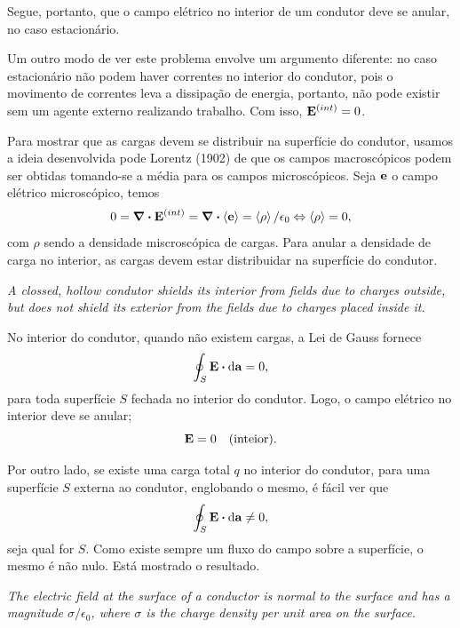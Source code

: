 Segue, portanto, que o campo elétrico no interior de um condutor deve se anular, no caso estacionário.

Um outro modo de ver este problema envolve um argumento diferente: no caso estacionário não podem haver correntes no interior do condutor, pois o movimento de correntes leva a dissipação de energia, portanto, não pode existir sem um agente externo realizando trabalho. Com isso, $\vb{E}^{(int)} = 0$.

Para mostrar que as cargas devem se distribuir na superfície do condutor, usamos a ideia desenvolvida pode Lorentz (1902) de que os campos macroscópicos podem ser obtidas tomando-se a média para os campos microscópicos. Seja $\vb{e}$ o campo elétrico microscópico, temos
\begin{equation*}
  0 = \div{\vb{E}^{(int)}} = \div{\ev{\vb{e}}} = \ev{\rho} / \epsilon_0 \Leftrightarrow \ev{\rho} = 0,
\end{equation*}
com $\rho$ sendo a densidade miscroscópica de cargas. Para anular a densidade de carga no interior, as cargas devem estar distribuidar na superfície do condutor.

\textit{A clossed, hollow condutor shields its interior from fields due to charges outside, but does not shield its exterior from the fields due to charges placed inside it.}

No interior do condutor, quando não existem cargas, a Lei de Gauss fornece
\begin{equation*}
  \oint_S \vb{E} \vdot \dd{\vb{a}} = 0,
\end{equation*}
para toda superfície $S$ fechada no interior do condutor. Logo, o campo elétrico no interior deve se anular;
\begin{equation*}
  \vb{E} = 0 \quad \text{(inteior).}
\end{equation*}

Por outro lado, se existe uma carga total $q$ no interior do condutor, para uma superfície $S$ externa ao condutor, englobando o mesmo, é fácil ver que
\begin{equation*}
  \oint_S \vb{E}\vdot \dd{\vb{a}} \neq 0,
\end{equation*}
seja qual for $S$. Como existe sempre um fluxo do campo sobre a superfície, o mesmo é não nulo. Está mostrado o resultado.

\textit{The electric field at the surface of a conductor is normal to the surface and has a magnitude $\sigma/\epsilon_0$, where $\sigma$ is the charge density per unit area on the surface.}

